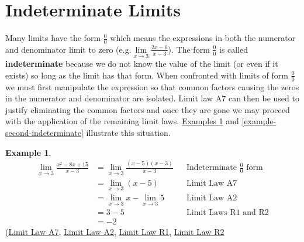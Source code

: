 \documentclass[12pt,]{book}
\newcommand{\terminology}[1]{\textbf{#1}}
\theoremstyle{plain}
\theoremstyle{definition}
\newtheorem{example}[theorem]{Example}
\numberwithin{equation}{section}
\begin{document}
\section[Indeterminate Limits]{Indeterminate Limits}\label{section-indeterminate-limits}
Many limits have the form \(\frac{0}{0}\) which means the expressions in both the numerator and denominator limit to zero (e.g.\@\(\lim\limits_{x\to3}\frac{2x-6}{x-3}\)). The form \(\frac{0}{0}\) is called \terminology{indeterminate} because we do not know the value of the limit (or even if it exists) so long as the limit has that form. When confronted with limits of form \(\frac{0}{0}\) we must first manipulate the expression so that common factors causing the zeros in the numerator and denominator are isolated. Limit law A7 can then be used to justify eliminating the common factors and once they are gone we may proceed with the application of the remaining limit laws. \hyperref[example-first-indeterminate]{Examples \ref{example-first-indeterminate}} and \hyperref[example-second-indeterminate]{\ref{example-second-indeterminate}} illustrate this situation.%
\begin{example}\label{example-first-indeterminate}
\begin{align*}
\lim_{x\to3}\frac{x^2-8x+15}{x-3}&=\lim_{x\to3}\frac{(x-5)(x-3)}{x-3}&&\text{Indeterminate $\frac{0}{0}$ form}\\
&=\lim_{x\to3}(x-5)&&\text{Limit Law A7}\\
&=\lim_{x\to3}x-\lim_{x\to3}5&&\text{Limit Law A2}\\
&=3-5&&\text{Limit Laws R1 and R2}\\
&=-2
\end{align*}(\hyperref[lla7]{Limit Law A7}, \hyperref[lla2]{Limit Law A2}, \hyperref[llr1]{Limit Law R1}, \hyperref[llr2]{Limit Law R2}%
\end{example}
\end{document}

